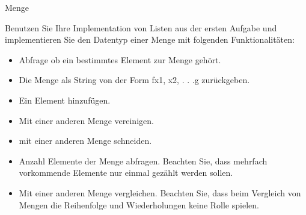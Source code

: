 \begin{questions}
   \pagebreak
	\question Menge
	
	Benutzen Sie Ihre Implementation von Listen aus der ersten Aufgabe und implementieren Sie den Datentyp einer Menge mit folgenden Funktionalitäten:
	
	\begin{itemize}
	 \item Abfrage ob ein bestimmtes Element zur Menge gehört.
	 \item Die Menge als String von der Form fx1, x2, . . .g zurückgeben.
	  \item Ein Element hinzufügen.
	  \item Mit einer anderen Menge vereinigen.
	  \item mit einer anderen Menge schneiden.
	  \item Anzahl Elemente der Menge abfragen. Beachten Sie, dass mehrfach vorkommende Elemente nur einmal gezählt werden sollen.
	  \item Mit einer anderen Menge vergleichen. Beachten Sie, dass beim Vergleich von
Mengen die Reihenfolge und Wiederholungen keine Rolle spielen.
	\end{itemize}

	
	\begin{solutionordottedlines}[2cm]
	[language=Java]
	\end{solutionordottedlines}
		
		
	
\end{questions}

